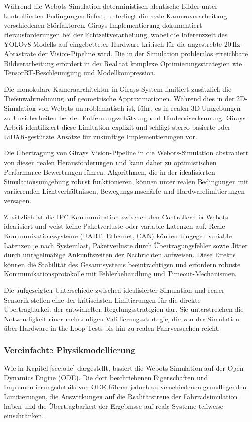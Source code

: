 Während die Webots-Simulation deterministisch identische Bilder unter kontrollierten Bedingungen liefert, unterliegt die reale 
Kameraverarbeitung verschiedenen Störfaktoren. Girays Implementierung dokumentiert Herausforderungen bei der Echtzeitverarbeitung, 
wobei die Inferenzzeit des YOLOv8-Modells auf eingebetteter Hardware kritisch für die angestrebte 20\,Hz-Abtastrate der Vision-Pipeline 
wird. Die in der Simulation problemlos erreichbare Bildverarbeitung erfordert in der Realität komplexe 
Optimierungsstrategien wie TensorRT-Beschleunigung und Modellkompression.

Die monokulare Kameraarchitektur in Girays System limitiert zusätzlich die Tiefenwahrnehmung auf geometrische Approximationen. Während 
dies in der 2D-Simulation von Webots unproblematisch ist, führt es in realen 3D-Umgebungen zu Unsicherheiten bei der Entfernungsschätzung 
und Hinderniserkennung. Girays Arbeit identifiziert diese Limitation explizit und schlägt stereo-basierte oder LiDAR-gestützte Ansätze für 
zukünftige Implementierungen vor.

Die Übertragung von Girays Vision-Pipeline in die Webots-Simulation abstrahiert von diesen realen Herausforderungen und kann daher zu 
optimistischen Performance-Bewertungen führen. Algorithmen, die in der idealisierten Simulationsumgebung robust funktionieren, können 
unter realen Bedingungen mit variierenden Lichtverhältnissen, Bewegungsunschärfe und Hardwarelimitierungen versagen.

Zusätzlich ist die IPC-Kommunikation zwischen den Controllern in Webots idealisiert und weist keine Paketverluste oder variable Latenzen 
auf. Reale Kommunikationssysteme (UART, Ethernet, CAN) können hingegen variable Latenzen je nach Systemlast, Paketverluste durch 
Übertragungsfehler sowie Jitter durch unregelmäßige Ankunftszeiten der Nachrichten aufweisen. Diese Effekte können die Stabilität 
des Gesamtsystems beeinträchtigen und erfordern robuste Kommunikationsprotokolle mit Fehlerbehandlung und Timeout-Mechanismen.

Die aufgezeigten Unterschiede zwischen idealisierter Simulation und realer Sensorik stellen eine der kritischsten Limitierungen für 
die direkte Übertragbarkeit der entwickelten Regelungsstrategien dar. Sie unterstreichen die Notwendigkeit einer mehrstufigen 
Validierungsstrategie, die von der Simulation über Hardware-in-the-Loop-Tests bis hin zu realen Fahrversuchen reicht.

\subsubsection{Vereinfachte Physikmodellierung}
Wie in Kapitel \ref{sec:ode} dargestellt, basiert die Webots-Simulation auf der Open Dynamics Engine (ODE). Die dort beschriebenen 
Eigenschaften und Implementierungsdetails von ODE führen jedoch zu verschiedenen grundlegenden Limitierungen, die Auswirkungen 
auf die Realitätstreue der Fahrradsimulation haben und die Übertragbarkeit der Ergebnisse auf reale Systeme teilweise einschränken.

